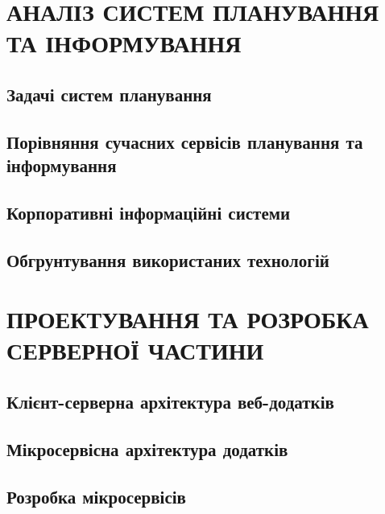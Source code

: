 \documentclass[a4paper,14pt]{extarticle} %
\begin{document}

\tableofcontents %
\clearpage


\section{АНАЛІЗ СИСТЕМ ПЛАНУВАННЯ ТА ІНФОРМУВАННЯ}
\subsection{Задачі систем планування} 

\subsection{Порівняння сучасних сервісів планування та інформування} 


\subsection{Корпоративні інформаційні системи} 



\subsection{Обгрунтування використаних технологій} 



\clearpage
\section{ПРОЕКТУВАННЯ ТА РОЗРОБКА СЕРВЕРНОЇ ЧАСТИНИ}

\subsection{Клієнт-серверна архітектура веб-додатків} 


\subsection{Мікросервісна архітектура додатків} 


\subsection{Розробка мікросервісів} 


\end{document}

